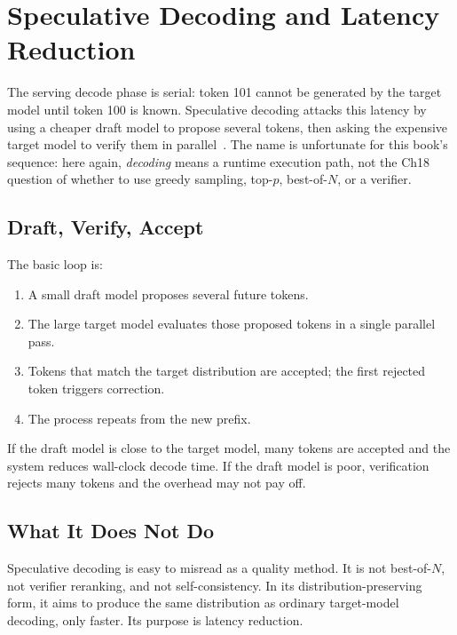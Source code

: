 \section{Speculative Decoding and Latency Reduction}
\label{sec:ch19-speculative}

The serving decode phase is serial: token 101 cannot be generated by the target model until token 100 is known. Speculative decoding attacks this latency by using a cheaper draft model to propose several tokens, then asking the expensive target model to verify them in parallel~\cite{leviathan2023speculative}. The name is unfortunate for this book's sequence: here again, \emph{decoding} means a runtime execution path, not the Ch18 question of whether to use greedy sampling, top-$p$, best-of-$N$, or a verifier.

\subsection{Draft, Verify, Accept}

The basic loop is:

\begin{enumerate}[nosep]
  \item A small draft model proposes several future tokens.
  \item The large target model evaluates those proposed tokens in a single parallel pass.
  \item Tokens that match the target distribution are accepted; the first rejected token triggers correction.
  \item The process repeats from the new prefix.
\end{enumerate}

If the draft model is close to the target model, many tokens are accepted and the system reduces wall-clock decode time. If the draft model is poor, verification rejects many tokens and the overhead may not pay off.

\subsection{What It Does Not Do}

Speculative decoding is easy to misread as a quality method. It is not best-of-$N$, not verifier reranking, and not self-consistency. In its distribution-preserving form, it aims to produce the same distribution as ordinary target-model decoding, only faster. Its purpose is latency reduction.

